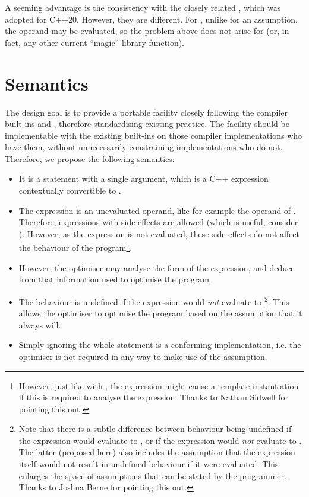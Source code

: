 A seeming advantage is the consistency with the closely related  \cite{P1007R3}, which was adopted for C++20. However, they are different. For ,  unlike for an assumption, the operand may be evaluated, so the problem above does not arise for  (or, in fact, any other current ``magic'' library function).



\section{Semantics}

The design goal is to provide a portable facility closely following the compiler built-ins  and , therefore standardising existing practice. The facility should be implementable with the existing built-ins on those compiler implementations who have them, without unnecessarily constraining implementations who do not. Therefore, we propose the following semantics:
\begin{itemize}
\item It is a statement with a single argument, which is a C++ expression contextually convertible to .
\item The expression is an unevaluated operand, like for example the operand of . Therefore, expressions with side effects are allowed (which is useful, consider ). However, as the expression is not evaluated, these side effects do not affect the behaviour of the program\footnote{However, just like with , the expression might cause a template instantiation if this is required to analyse the expression. Thanks to Nathan Sidwell for pointing this out.}.
\item However, the optimiser may analyse the form of the expression, and deduce from that information used to optimise the program.
\item The behaviour is undefined if the expression would \emph{not} evaluate to \footnote{Note that there is a subtle difference between behaviour being undefined if the expression would evaluate to , or if the expression would \emph{not} evaluate to . The latter (proposed here) also includes the assumption that the expression itself would not result in undefined behaviour if it were evaluated. This enlarges the space of assumptions that can be stated by the programmer. Thanks to Joshua Berne for pointing this out.}. This allows the optimiser to optimise the program based on the assumption that it always will.
\item Simply ignoring the whole statement is a conforming implementation, i.e. the optimiser is not required in any way to make use of the assumption.
\end{itemize}


